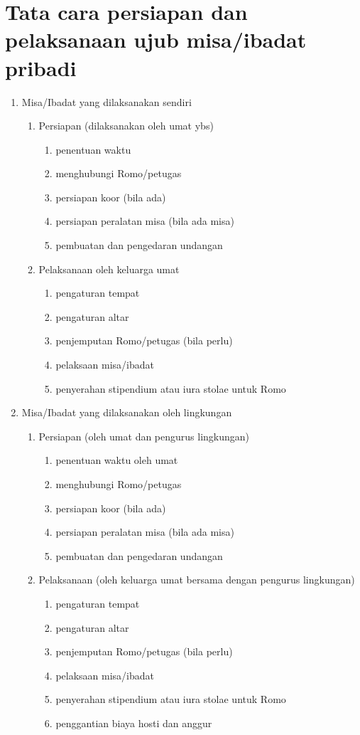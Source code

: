 \documentclass[a5paper,titlepage,11pt]{book}
\begin{document}
\section{Tata cara persiapan dan pelaksanaan ujub misa/ibadat pribadi}
\begin{enumerate}
\item Misa/Ibadat yang dilaksanakan sendiri
	\begin{enumerate}
	\item Persiapan (dilaksanakan oleh umat ybs)
			\begin{enumerate}
			\item penentuan waktu
			\item menghubungi Romo/petugas
			\item persiapan koor (bila ada)
			\item persiapan peralatan misa (bila ada misa)
			\item pembuatan dan pengedaran undangan
			\end{enumerate}
	\item Pelaksanaan oleh keluarga umat
			\begin{enumerate}
			\item pengaturan tempat
			\item pengaturan altar
			\item penjemputan Romo/petugas (bila perlu)
			\item pelaksaan misa/ibadat
			\item penyerahan stipendium atau iura stolae untuk Romo
			\end{enumerate}
	\end{enumerate}
\item Misa/Ibadat yang dilaksanakan oleh lingkungan
	\begin{enumerate}
	\item Persiapan (oleh umat dan pengurus lingkungan)
			\begin{enumerate}
			\item penentuan waktu oleh umat
			\item menghubungi Romo/petugas
			\item persiapan koor (bila ada)
			\item persiapan peralatan misa (bila ada misa)
			\item pembuatan dan pengedaran undangan
			\end{enumerate}
	\item Pelaksanaan (oleh keluarga umat bersama dengan pengurus lingkungan)
			\begin{enumerate}
			\item pengaturan tempat
			\item pengaturan altar
			\item penjemputan Romo/petugas (bila perlu)
			\item pelaksaan misa/ibadat
			\item penyerahan stipendium atau iura stolae untuk Romo
			\item penggantian biaya hosti dan anggur
			\end{enumerate}
	\end{enumerate}
\end{enumerate}
\end{document}
